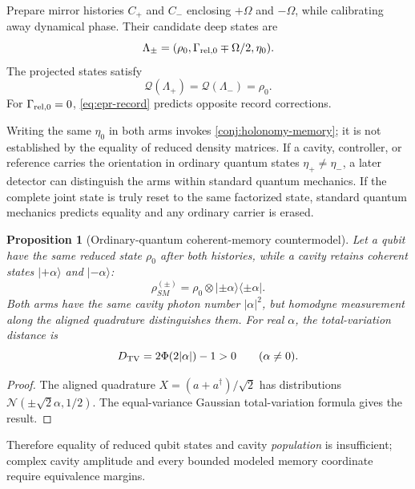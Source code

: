 \documentclass[10pt]{article}
\newtheorem{proposition}[theorem]{Proposition}
\theoremstyle{definition}
\theoremstyle{remark}
\newcommand{\cQ}{\mathcal Q}
\newcommand{\ket}[1]{\lvert #1\rangle}
\newcommand{\proj}[1]{\lvert #1\rangle\!\langle #1\rvert}
\begin{document}
Prepare mirror histories \(C_+\) and \(C_-\) enclosing \(+\Omega\) and \(-\Omega\), while calibrating away dynamical phase. Their candidate deep states are
\begin{equation}
  \Lambda_\pm=(\rho_0,\Gamma_{{\rm rel},0}\mp\Omega/2,\eta_0).
\end{equation}
The projected states satisfy
\begin{equation}
  \cQ(\Lambda_+)=\cQ(\Lambda_-)=\rho_0.
  \label{eq:same-rho}
\end{equation}
For \(\Gamma_{{\rm rel},0}=0\), \cref{eq:epr-record} predicts opposite record corrections.

Writing the same \(\eta_0\) in both arms invokes \cref{conj:holonomy-memory}; it is not established by the equality of reduced density matrices. If a cavity, controller, or reference carries the orientation in ordinary quantum states \(\eta_+\neq\eta_-\), a later detector can distinguish the arms within standard quantum mechanics. If the complete joint state is truly reset to the same factorized state, standard quantum mechanics predicts equality and any ordinary carrier is erased.

\begin{proposition}[Ordinary-quantum coherent-memory countermodel]
\label{prop:coherent-memory}
Let a qubit have the same reduced state \(\rho_0\) after both histories, while a cavity retains coherent states \(\ket{+\alpha}\) and \(\ket{-\alpha}\):
\[
\rho_{SM}^{(\pm)}
=
\rho_0\otimes\proj{\pm\alpha}.
\]
Both arms have the same cavity photon number \(|\alpha|^2\), but homodyne measurement along the aligned quadrature distinguishes them. For real \(\alpha\), the total-variation distance is
\[
D_{\rm TV}
=2\Phi(2|\alpha|)-1>0
\qquad(\alpha\neq0).
\]
\end{proposition}

\begin{proof}
The aligned quadrature \(X=(a+a^\dagger)/\sqrt2\) has distributions
\(\mathcal N(\pm\sqrt2\alpha,1/2)\).
The equal-variance Gaussian total-variation formula gives the result.
\end{proof}

Therefore equality of reduced qubit states and cavity \emph{population} is insufficient; complex cavity amplitude and every bounded modeled memory coordinate require equivalence margins.
\end{document}
